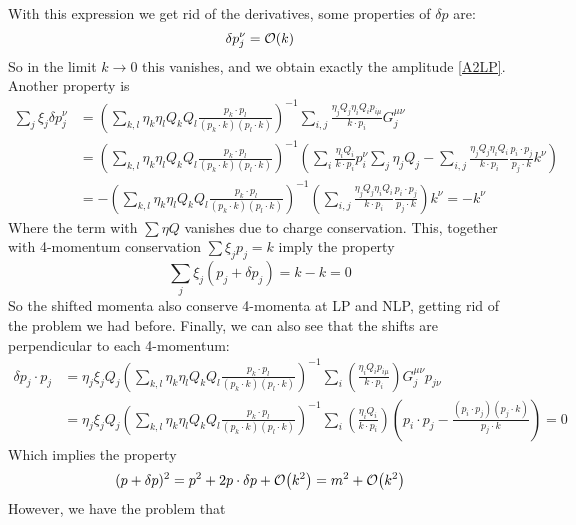 \documentclass{article}
\begin{document}
With this expression we get rid of the derivatives, some properties of $\delta p$ are:
\begin{equation}
	\delta p_j^\nu = \order{k}
\end{equation}
So in the limit $k\to 0$ this vanishes, and we obtain exactly the amplitude \eqref{A2LP}. Another property is
\begin{align*}
	\sum_j \xi_j \delta p_j^\nu&
	= \left(\sum_{k, l} \eta_k \eta_l Q_k Q_l \frac{p_k \cdot p_l}{(p_k \cdot k)(p_l \cdot k)}\right)^{-1}\sum_{i,j} \frac{\eta_jQ_j\eta_i Q_i p_{i\mu}}{k\cdot p_i} G_j^{\mu\nu}\\&
	=\left(\sum_{k, l} \eta_k \eta_l Q_k Q_l \frac{p_k \cdot p_l}{(p_k \cdot k)(p_l \cdot k)}\right)^{-1}\left(\sum_{i} \frac{\eta_i Q_i }{k\cdot p_i} p_i^\nu\sum_j \eta_jQ_j - \sum_{i,j} \frac{\eta_jQ_j\eta_i Q_i }{k\cdot p_i} \frac{p_i \cdot p_j}{p_j\cdot k}k^\nu\right)\\&
	=-\left(\sum_{k, l} \eta_k \eta_l Q_k Q_l \frac{p_k \cdot p_l}{(p_k \cdot k)(p_l \cdot k)}\right)^{-1}\left(\sum_{i,j} \frac{\eta_jQ_j\eta_i Q_i }{k\cdot p_i} \frac{p_i \cdot p_j}{p_j\cdot k}\right)k^\nu
	= -k^\nu
\end{align*}
Where the term with $\sum \eta Q$ vanishes due to charge conservation. This, together with 4-momentum conservation $\sum \xi_j p_j = k$ imply the property
\begin{equation}
	\sum_j \xi_j (p_j + \delta p_j) = k - k= 0
\end{equation}
So the shifted momenta also conserve 4-momenta at LP and NLP, getting rid of the problem we had before.
Finally, we can also see that the shifts are perpendicular to each 4-momentum:
\begin{align*}
	\delta p_j \cdot p_j &= \eta_j\xi_jQ_j\left(\sum_{k, l} \eta_k \eta_l Q_k Q_l \frac{p_k \cdot p_l}{(p_k \cdot k)(p_l \cdot k)}\right)^{-1}\sum_{i} \left(\frac{\eta_i Q_i p_{i\mu}}{k\cdot p_i}\right) G_j^{\mu\nu}p_{j\nu}\\&
	= \eta_j\xi_jQ_j\left(\sum_{k, l} \eta_k \eta_l Q_k Q_l \frac{p_k \cdot p_l}{(p_k \cdot k)(p_l \cdot k)}\right)^{-1}\sum_{i} \left(\frac{\eta_i Q_i}{k\cdot p_i}\right) \left(p_i\cdot p_j - \frac{(p_i\cdot p_j)(p_j\cdot k)}{p_j\cdot k}\right)
	= 0
\end{align*}
Which implies the property
\begin{equation}
	(p+\delta p)^2 = p^2 + 2 p\cdot \delta p + \order{k^2} = m^2 + \order{k^2}
\end{equation}
However, we have the problem that
\end{document}
